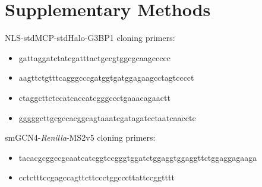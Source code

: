\chapter{Supplementary Methods} \label{sec:appendA}

NLS-stdMCP-stdHalo-G3BP1 cloning primers:
\begin{itemize}
    \itemsep-0.5em
    \item gattaggatctatcgatttactgccgtggcgcaagccccc
    \item aagttctgtttcagggcccgatggtgatggagaagcctagtcccct
    \item ctaggcttctccatcaccatcgggccctgaaacagaactt
    \item gggggcttgcgccacggcagtaaatcgatagatcctaatcaacctc
\end{itemize}

smGCN4-\textit{Renilla}-MS2v5 cloning primers:
\begin{itemize}
    \itemsep-0.5em
    \item tacacgcggccgcaatcatcggtccgggtggatctggaggtggaggttctggaggagaaga
    \item cctctttccgagccagttcttccctggcccttattccggtttt
\end{itemize}

